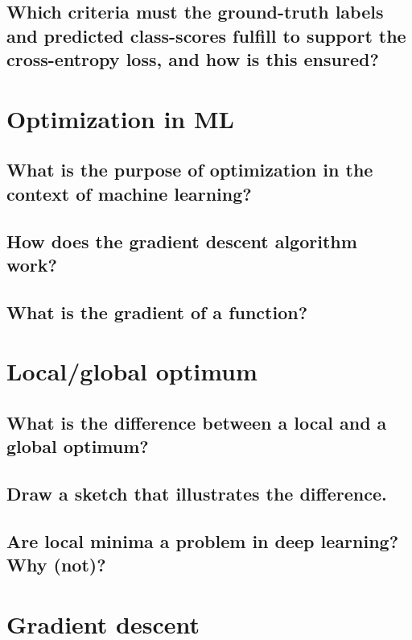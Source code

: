 \subsection{Which criteria must the ground-truth labels and predicted class-scores fulfill to support the cross-entropy loss, and how is this ensured?}

\section{Optimization in ML}

\subsection{What is the purpose of optimization in the context of machine learning?}

\subsection{How does the gradient descent algorithm work?}

\subsection{What is the gradient of a function? }

\section{Local/global optimum}

\subsection{What is the difference between a local and a global optimum?}

\subsection{Draw a sketch that illustrates the difference.}

\subsection{Are local minima a problem in deep learning?  Why (not)?}

\section{Gradient descent}

